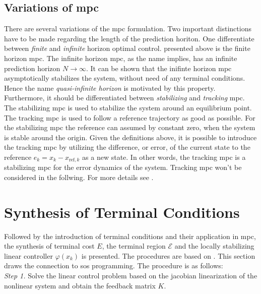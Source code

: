 \documentclass[10pt,a4paper]{article}
\begin{document}
\subsection{Variations of \gls{mpc}}
There are several variations of the \gls{mpc} formulation. Two important distinctions have to be made regarding the length
of the prediction horiton. One differentiate between \textit{finite} and \textit{infinite} horizon optimal control. presented
above is the finite horizon \gls{mpc}. The infinite horizon \gls{mpc}, as the name implies, has an infinite prediction horizon
$N \rightarrow \infty$. It can be shown that the inifinte horizon \gls{mpc} asymptotically stabilizes the system, without need
of any terminal conditions. Hence the name \textit{quasi-infinite horizon} is motivated by this property.
Furthermore, it should be differentiated between \textit{stabilizing} and \textit{tracking} \gls{mpc}. The stabilizing \gls{mpc}
is used to stabilize the system around an equilibrium point. The tracking \gls{mpc} is used to follow
a reference trajectory as good as possible. For the stabilizing \gls{mpc} the reference can assumed by constant zero, when the 
system is stable around the origin. Given the definitions above, it is possible to introduce the tracking \gls{mpc} by utilizing
the difference, or error, of the current state to the reference $e_k = x_k - x_{\text{ref},k}$ as a new state. In other words,
the tracking \gls{mpc} is a stabilizing \gls{mpc} for the error dynamics of the system. Tracking \gls{mpc} won't be considered in
the follwing. For more details see \cite{nmpcBible}. 










\section{Synthesis of Terminal Conditions}
\label{sec:synTermCond}
Followed by the introduction of terminal conditions and their application in \gls{mpc}, the synthesis of terminal cost $E$, the
terminal region $\mathcal{E}$ and the locally stabilizing linear controller $\varphi(x_{k})$ is presented. The procedures are based
on \cite{CHEN19981205}. This section draws the connection to \gls{sos} programming. The procedure is as follows:\\

\textit{Step 1.} Solve the linear control problem based on the jacobian linearization of the nonlinear system and obtain the feedback
matrix $K$.\\
\end{document}
